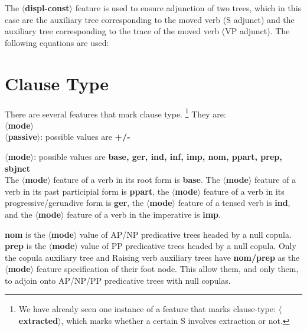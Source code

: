The {\bf $\langle$displ-const$\rangle$} feature is used to ensure
adjunction of two trees, which in this case are the auxiliary
tree corresponding to the moved verb (S adjunct) and the auxiliary tree
corresponding to the trace of the moved verb (VP adjunct). The following
equations are used:



\section{Clause Type}
There are several features that mark clause type.
\footnote{We have already
seen one instance of a feature that marks clause-type:
{\bf $\langle$extracted$\rangle$}, which marks whether a certain S
involves extraction or not.} They are:\\
{\bf $\langle$mode$\rangle$}\\
{\bf $\langle$passive$\rangle$}: possible values are {\bf +/-}


{\bf $\langle$mode$\rangle$}: possible values are 
{\bf base, ger, ind, inf, imp, nom, ppart, prep, sbjnct}\\
The {\bf $\langle$mode$\rangle$} feature of a verb in its root form is
{\bf base}. The {\bf $\langle$mode$\rangle$} feature of a verb in its past 
participial form is {\bf ppart}, the {\bf $\langle$mode$\rangle$} feature of a 
verb in its progressive/gerundive form is {\bf ger}, 
the {\bf $\langle$mode$\rangle$} feature of a tensed verb is {\bf ind},
and the {\bf $\langle$mode$\rangle$} feature of a verb in the imperative 
is {\bf imp}. 

{\bf nom} is the {\bf $\langle$mode$\rangle$} value of AP/NP predicative trees
headed by a null copula. 
{\bf prep} is the {\bf $\langle$mode$\rangle$} value of PP predicative trees
headed by a null copula. 
Only the copula auxiliary tree and Raising verb auxiliary trees have 
{\bf nom/prep} as the {\bf $\langle$mode$\rangle$} feature specification of their
foot node. This allow them, and only them, to adjoin onto AP/NP/PP predicative
trees with null copulas. 

